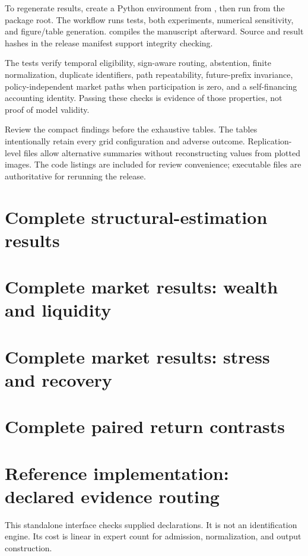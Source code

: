 To regenerate results, create a Python environment from , then run  from the package root. The workflow runs tests, both experiments, numerical sensitivity, and figure/table generation.  compiles the manuscript afterward. Source and result hashes in the release manifest support integrity checking.

The tests verify temporal eligibility, sign-aware routing, abstention, finite normalization, duplicate identifiers, path repeatability, future-prefix invariance, policy-independent market paths when participation is zero, and a self-financing accounting identity. Passing these checks is evidence of those properties, not proof of model validity.

Review the compact findings before the exhaustive tables. The tables intentionally retain every grid configuration and adverse outcome. Replication-level files allow alternative summaries without reconstructing values from plotted images. The code listings are included for review convenience; executable files are authoritative for rerunning the release.

\clearpage
\section{Complete structural-estimation results}

\clearpage
\section{Complete market results: wealth and liquidity}

\clearpage
\section{Complete market results: stress and recovery}

\clearpage
\section{Complete paired return contrasts}

\clearpage
\section{Reference implementation: declared evidence routing}
This standalone interface checks supplied declarations. It is not an identification engine. Its cost is linear in expert count for admission, normalization, and output construction.

\clearpage
